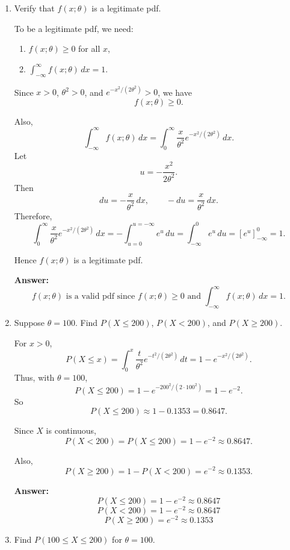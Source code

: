 \documentclass[11pt]{article}
\begin{document}
\begin{enumerate}
    \item[(a)] Verify that \(f(x;\theta)\) is a legitimate pdf.

    To be a legitimate pdf, we need:
    \begin{enumerate}
        \item \(f(x;\theta)\ge 0\) for all \(x\),
        \item \(\displaystyle \int_{-\infty}^{\infty} f(x;\theta)\,dx=1\).
    \end{enumerate}

    Since \(x>0\), \(\theta^2>0\), and \(e^{-x^2/(2\theta^2)}>0\), we have
    \[
    f(x;\theta)\ge 0.
    \]

    Also,
    \[
    \int_{-\infty}^{\infty} f(x;\theta)\,dx
    =\int_0^\infty \frac{x}{\theta^2}e^{-x^2/(2\theta^2)}\,dx.
    \]
    Let
    \[
    u=-\frac{x^2}{2\theta^2}.
    \]
    Then
    \[
    du=-\frac{x}{\theta^2}\,dx,
    \qquad
    -du=\frac{x}{\theta^2}\,dx.
    \]
    Therefore,
    \[
    \int_0^\infty \frac{x}{\theta^2}e^{-x^2/(2\theta^2)}\,dx
    =-\int_{u=0}^{u=-\infty} e^u\,du
    =\int_{-\infty}^{0} e^u\,du
    =\left[e^u\right]_{-\infty}^{0}
    =1.
    \]

    Hence \(f(x;\theta)\) is a legitimate pdf.

    \textbf{Answer:}
    \[
    \boxed{f(x;\theta)\text{ is a valid pdf since }f(x;\theta)\ge 0\text{ and }\int_{-\infty}^{\infty}f(x;\theta)\,dx=1.}
    \]

    \item[(b)] Suppose \(\theta=100\). Find \(P(X\le 200)\), \(P(X<200)\), and \(P(X\ge 200)\).

    For \(x>0\),
    \[
    P(X\le x)=\int_0^x \frac{t}{\theta^2}e^{-t^2/(2\theta^2)}\,dt
    =1-e^{-x^2/(2\theta^2)}.
    \]
    Thus, with \(\theta=100\),
    \[
    P(X\le 200)=1-e^{-200^2/(2\cdot 100^2)}
    =1-e^{-2}.
    \]
    So
    \[
    P(X\le 200)\approx 1-0.1353=0.8647.
    \]

    Since \(X\) is continuous,
    \[
    P(X<200)=P(X\le 200)=1-e^{-2}\approx 0.8647.
    \]

    Also,
    \[
    P(X\ge 200)=1-P(X<200)=e^{-2}\approx 0.1353.
    \]

    \textbf{Answer:}
    \[
    \boxed{P(X\le 200)=1-e^{-2}\approx 0.8647}
    \]
    \[
    \boxed{P(X<200)=1-e^{-2}\approx 0.8647}
    \]
    \[
    \boxed{P(X\ge 200)=e^{-2}\approx 0.1353}
    \]

    \item[(c)] Find \(P(100\le X\le 200)\) for \(\theta=100\).


\end{enumerate}
\end{document}
